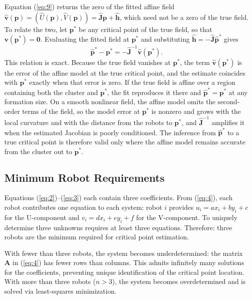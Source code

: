 \documentclass[lettersize,journal]{IEEEtran}
\begin{document}
Equation (\ref{eq:9}) returns the zero of the fitted affine field $\hat{\mathbf{v}}(\mathbf{p}) = (\hat{U}(\mathbf{p}), \hat{V}(\mathbf{p})) = \hat{\mathbf{J}}\mathbf{p} + \hat{\mathbf{h}}$, which need not be a zero of the true field. To relate the two, let $\mathbf{p}^*$ be any critical point of the true field, so that $\mathbf{v}(\mathbf{p}^*) = \mathbf{0}$. Evaluating the fitted field at $\mathbf{p}^*$ and substituting $\hat{\mathbf{h}} = -\hat{\mathbf{J}}\hat{\mathbf{p}}^*$ gives
\begin{equation}\label{eq:scope}
\hat{\mathbf{p}}^* - \mathbf{p}^* = -\hat{\mathbf{J}}^{-1}\hat{\mathbf{v}}(\mathbf{p}^*).
\end{equation}
This relation is exact. Because the true field vanishes at $\mathbf{p}^*$, the term $\hat{\mathbf{v}}(\mathbf{p}^*)$ is the error of the affine model at the true critical point, and the estimate coincides with $\mathbf{p}^*$ exactly when that error is zero. If the true field is affine over a region containing both the cluster and $\mathbf{p}^*$, the fit reproduces it there and $\hat{\mathbf{p}}^* = \mathbf{p}^*$ at any formation size. On a smooth nonlinear field, the affine model omits the second-order terms of the field, so the model error at $\mathbf{p}^*$ is nonzero and grows with the local curvature and with the distance from the robots to $\mathbf{p}^*$, and $\hat{\mathbf{J}}^{-1}$ amplifies it when the estimated Jacobian is poorly conditioned. The inference from $\hat{\mathbf{p}}^*$ to a true critical point is therefore valid only where the affine model remains accurate from the cluster out to $\mathbf{p}^*$.


\subsection{Minimum Robot Requirements}

Equations (\ref{eq:2})--(\ref{eq:3}) each contain three coefficients. From (\ref{eq:4}), each robot contributes one equation to each system: robot $i$ provides $u_i = ax_i + by_i + c$ for the U-component and $v_i = dx_i + ey_i + f$ for the V-component. To uniquely determine three unknowns requires at least three equations. Therefore: three robots are the minimum required for critical point estimation.

With fewer than three robots, the system becomes underdetermined: the matrix $\mathbf{A}$ in (\ref{eq:4}) has fewer rows than columns. This admits infinitely many solutions for the coefficients, preventing unique identification of the critical point location. With more than three robots ($n > 3$), the system becomes overdetermined and is solved via least-squares minimization.
\end{document}
